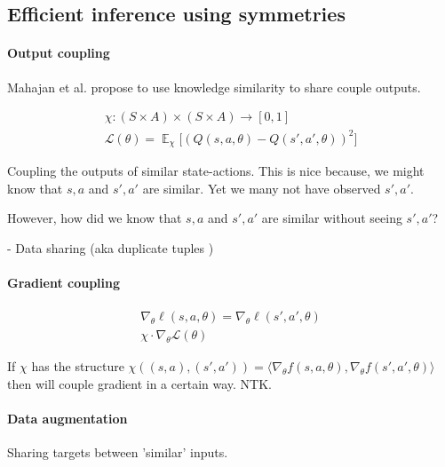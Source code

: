 \subsection{Efficient inference using symmetries}\label{symmetry-inference}

\paragraph{Output coupling}

Mahajan et al. propose to use knowledge similarity to share couple outputs.
\cite{Mahajan2017}

\begin{align*}
\chi: (S\times A) \times (S\times A) \to [0, 1] \\
\mathcal L(\theta) = \mathop{\mathbb E}_{\chi} \Big[(Q(s, a, \theta)-Q(s', a', \theta))^2 \Big]
\end{align*}

Coupling the outputs of similar state-actions. This is nice because, we might know
that $s, a$ and $s', a'$ are similar. Yet we many not have observed $s', a'$.


However, how did we know that $s, a$ and $s', a'$ are similar without seeing $s', a'$?

- Data sharing (aka duplicate tuples \cite{Ho2019a})

\paragraph{Gradient coupling}

\begin{align*}
\nabla_{\theta} \ell(s, a, \theta) = \nabla_{\theta} \ell(s', a', \theta) \\
\chi \cdot \nabla_{\theta} \mathcal L(\theta)
\end{align*}

If $\chi$ has the structure $\chi((s, a), (s', a')) = \langle \nabla_{\theta}f(s, a, \theta), \nabla_{\theta} f(s', a', \theta) \rangle$ then will couple gradient in a certain way. NTK.

\cite{Ho2019a}

\paragraph{Data augmentation}

Sharing targets between 'similar' inputs.

